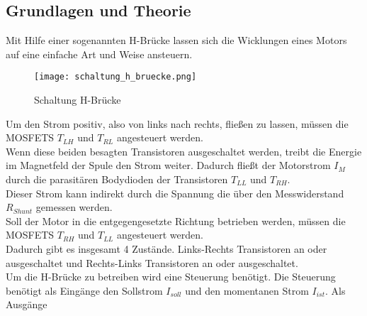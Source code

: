 \subsection{Grundlagen und Theorie}

Mit Hilfe einer sogenannten H-Brücke lassen sich die Wicklungen eines
Motors auf eine einfache Art und Weise ansteuern.\\

\begin{figure}[H]
    \centering
    \texttt{[image: schaltung\_h\_bruecke.png]}
    \caption{Schaltung H-Brücke}
    \label{fig:Schaltung H-Bridge}
\end{figure}

Um den Strom positiv, also von links nach rechts, fließen zu lassen,
müssen die MOSFETS $T_{LH}$ und $T_{RL}$ angesteuert werden.\\

Wenn diese beiden besagten Transistoren ausgeschaltet werden, treibt die Energie im
Magnetfeld der Spule den Strom weiter. Dadurch fließt der Motorstrom $I_M$
durch die parasitären Bodydioden der Transistoren $T_{LL}$ und $T_{RH}$.\\

Dieser Strom kann indirekt durch die Spannung die über den Messwiderstand
$R_{Shunt}$ gemessen werden.\\

Soll der Motor in die entgegengesetzte Richtung betrieben werden, müssen
die MOSFETS $T_{RH}$ und $T_{LL}$ angesteuert werden.\\

Dadurch gibt es insgesamt 4 Zustände. Links-Rechts Transistoren an oder
ausgeschaltet und Rechts-Links Transistoren an oder ausgeschaltet.\\

Um die H-Brücke zu betreiben wird eine Steuerung benötigt. Die Steuerung
benötigt als Eingänge den Sollstrom $I_{soll}$ und den momentanen Strom
$I_{ist}$. Als Ausgänge 










